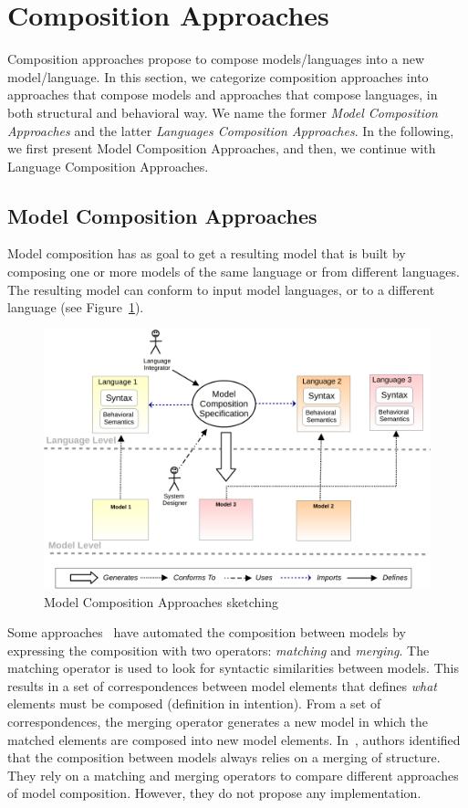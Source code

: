 \section{Composition Approaches}
Composition approaches propose to compose models/languages into a new model/language. In this section, we categorize composition approaches into approaches that compose models and approaches that compose languages, in both structural and behavioral way.  We name the former \emph{Model Composition Approaches} and the latter \emph{Languages Composition Approaches}. In the following, we first present Model Composition Approaches, and then, we continue with Language Composition Approaches. 
\subsection{Model Composition Approaches}
Model composition has as goal to get a resulting model that is built by composing one or more models of the same language or from different languages. The resulting model can conform to input model languages, or to a different language (see Figure~\ref{fig:modelcompo}).

\begin{figure}
	\begin{center}
		\includegraphics[width=1\textwidth]{background/figs/modelcompo}
		\caption{Model Composition Approaches sketching}
		\label{fig:modelcompo}
	\end{center}
\end{figure}

Some approaches~\cite{mergemanifest,epsilon,kompose} have automated the composition between models by expressing the composition with two operators: \emph{matching} and \emph{merging}. The matching operator is used to look for syntactic similarities between models. This results in a set of correspondences between model elements that defines \emph{what} elements must be composed (definition in intention). From a set of correspondences, the merging operator generates a new model in which the matched elements are composed into new model elements. In~\cite{mergemanifest}, authors identified that the composition between models always relies on a merging of structure. They rely on a matching and merging operators to compare different approaches of model composition. However, they do not propose any implementation.

